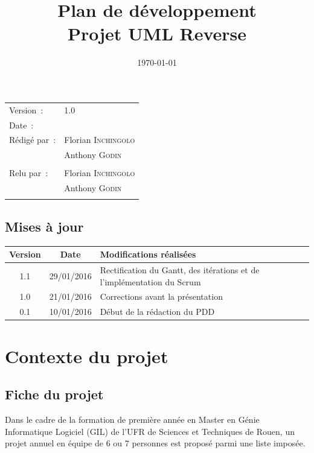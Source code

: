 \documentclass[hidelinks, 10pt,a4paper]{article}
\title{\bfseries Plan de développement\\Projet UML Reverse}
\begin{document}
\maketitle
\begin{center}
\begin{tabular}{ll}
  Version~: & 1.0\\[.5em]
  Date~: & \date{\today}\\[.5em]
  Rédigé par~: & Florian \textsc{Inchingolo}\\
               & Anthony \textsc{Godin}\\
               &\\[.5em]
  Relu par~:   & Florian \textsc{Inchingolo}\\
               & Anthony \textsc{Godin}\\
               &\\
\end{tabular}
\end{center}

\newpage
\begin{center}
    \section*{Mises à jour}
    \begin{tabular}{|c|c|p{8cm}|}
        \hline{\textbf{Version}} & {\textbf{Date}} & {\textbf{Modifications réalisées}}\\\hline
        {1.1} & {29/01/2016} & {Rectification du Gantt, des itérations et de l'implémentation du Scrum}\\\hline
        {1.0} & {21/01/2016} & {Corrections avant la présentation}\\\hline
        {0.1} & {10/01/2016} & {Début de la rédaction du PDD}\\\hline
    \end{tabular}
\end{center}

\newpage
\tableofcontents

\newpage
\section{Contexte du projet}
\subsection{Fiche du projet}
Dans le cadre de la formation de première année en Master en Génie Informatique Logiciel (GIL)
de l'UFR de Sciences et Techniques de Rouen, un projet annuel en équipe de 6 ou 7 personnes
est proposé parmi une liste imposée.
\end{document}
